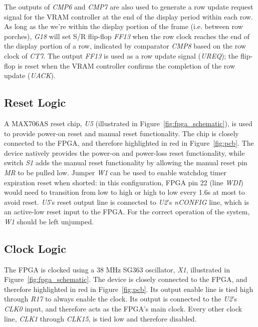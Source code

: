 \documentclass{scrartcl}
\begin{document}
{	The outputs of \textit{CMP6} and \textit{CMP7} are also used to generate a row update request signal for the VRAM controller at the end of the display period within each row. As long as the we're within the display portion of the frame (i.e. between row porches), \textit{G18} will set S/R flip-flop \textit{FF13} when the row clock reaches the end of the display portion of a row, indicated by comparator \textit{CMP8} based on the row clock of \textit{CT7}. The output \textit{FF13} is used as a row update signal (\textit{UREQ}); the flip-flop is reset when the VRAM controller confirms the completion of the row update (\textit{UACK}).

	\subsection{Reset Logic}
	A MAX706AS reset chip, \textit{U5} (illustrated in Figure~\ref{fig:fpga_schematic}), is used to provide power-on reset and manual reset functionality. The chip is closely connected to the FPGA, and therefore highlighted in red in Figure~\ref{fig:pcb}. The device natively provides the power-on and power-loss reset functionality, while switch \textit{S1} adds the manual reset functionality by allowing the manual reset pin \textit{MR} to be pulled low. Jumper \textit{W1} can be used to enable watchdog timer expiration reset when shorted: in this configuration, FPGA pin 22 (line \textit{WDI}) would need to transition from low to high or high to low every 1.6s at most to avoid reset. \textit{U5}'s reset output line is connected to \textit{U2}'s \textit{nCONFIG} line, which is an active-low reset input to the FPGA. For the correct operation of the system, \textit{W1} should be left unjumped.\\

	\subsection{Clock Logic}
	The FPGA is clocked using a 38 MHz SG363 oscillator, \textit{X1}, illustrated in Figure~\ref{fig:fpga_schematic}. The device is closely connected to the FPGA, and therefore highlighted in red in Figure~\ref{fig:pcb}. Its output enable line is tied high through \textit{R17} to always enable the clock. Its output is connected to the \textit{U2}'s \textit{CLK0} input, and therefore acts as the FPGA's main clock. Every other clock line, \textit{CLK1} through \textit{CLK15}, is tied low and therefore disabled.\\

}
\end{document}
